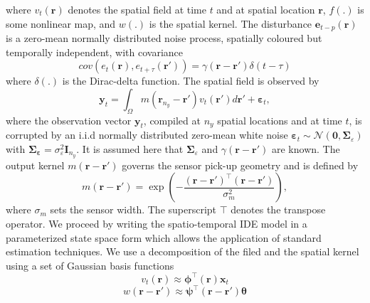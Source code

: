 \documentclass[a4paper,10pt]{article}
\begin{document}
where $v_t(\mathbf r)$ denotes the spatial field at time $t$ and at spatial location $\mathbf r$, $f(.)$ is some nonlinear map, and $w(.)$ is the spatial kernel. The disturbance $\mathbf e_{t-p}(\mathbf r)$ is a zero-mean normally distributed noise process, spatially
coloured but temporally independent, with covariance
\begin{equation}
cov\left(e_{t}\left(\mathbf{r}\right),e_{t+\tau}\left(\mathbf{r'}\right)\right)=
\gamma\left(\mathbf{r}-\mathbf{r'}\right)\delta(t-\tau)
\label{eq:FieldCovariance}
\end{equation}
where $\delta(.)$ is the Dirac-delta function.
 The spatial field is observed by
\begin{equation}
    \label{eq:ObservationEquation}
	\mathbf{y}_t =
	\int_{\Omega}{
	    m\left(\mathbf{r}_{n_y}-\mathbf{r}'\right)v_t\left(\mathbf{r}'\right)
	d\mathbf{r}'} + 
	\boldsymbol{\varepsilon}_t, 
\end{equation}
where the observation vector $\mathbf{y}_{t}$, compiled at $n_{y}$ spatial locations and at time $t$, is corrupted by an i.i.d normally distributed zero-mean white noise ${\boldsymbol\varepsilon}_t\sim \mathcal{N}\left(\mathbf{0},\boldsymbol\Sigma_{\varepsilon}\right)$ with $\mathbf{\Sigma}_{\boldsymbol\varepsilon}=\sigma_{\varepsilon}^2\mathbf I_{n_y} $. It is assumed here that $\boldsymbol\Sigma_{\varepsilon}$ and $\gamma\left(\mathbf r-\mathbf r' \right)$ are known. The output kernel $m(\mathbf{r}-\mathbf{r}')$ governs the sensor pick-up geometry and is defined by 
\begin{equation}\label{eq:SensorKernel}
	m\left(\mathbf{r}-\mathbf{r}'\right) = \exp{\left(-\frac{(\mathbf{r}-\mathbf{r}')^\top(\mathbf{r}-\mathbf{r}')}{\sigma_m^2}\right)},
\end{equation}
where $\sigma_m$ sets the sensor width. The superscript $\top$ denotes the transpose operator. We proceed by writing the spatio-temporal IDE model in a parameterized state space form which allows the application of standard estimation
techniques. We use a decomposition of the filed and the spatial kernel using a set of Gaussian basis functions
 \begin{equation}
	\label{eq:FieldDecomp} v_t\left(\mathbf{r}\right) \approx \boldsymbol{\phi}^{\top}\left(\mathbf{r}\right) \mathbf{x}_t
\end{equation}
\begin{equation}\label{eq:KernelDecomp}
	 w\left(\mathbf{r}-\mathbf{r}'\right) \approx\boldsymbol{\psi}^\top\left(\mathbf{r}-\mathbf{r}'\right) \boldsymbol{\theta}
\end{equation}
\end{document}
